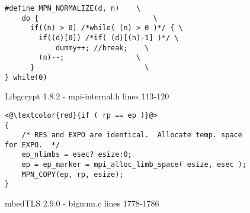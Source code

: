 \begin{figure}[h!]
\begin{lstlisting}
#define MPN_NORMALIZE(d, n)    \
    do {		                   \
      if((n) > 0) /*while( (n) > 0 )*/ { \
        if((d)[0]) /*if( (d)[(n)-1] )*/ \
            dummy++; //break;	 \
        (n)--;	               \
      }		                     \
} while(0)
\end{lstlisting}
\caption{Libgcrypt 1.8.2 - mpi-internal.h lines 113-120}
\label{code:libgcrypt_normalize}
\end{figure}


\begin{figure}[h!]
\begin{lstlisting}
<@\textcolor{red}{if ( rp == ep )}@>
{
    /* RES and EXPO are identical.  Allocate temp. space for EXPO.  */
    ep_nlimbs = esec? esize:0;
    ep = ep_marker = mpi_alloc_limb_space( esize, esec );
    MPN_COPY(ep, rp, esize);
}
\end{lstlisting}
\caption{mbedTLS 2.9.0 - bignum.c lines 1778-1786}
\label{code:libgcrypt_normalize}
\end{figure}
